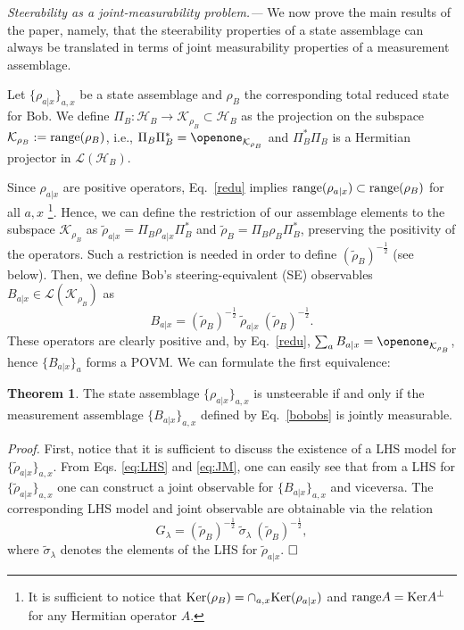 \documentclass[10pt,twocolumn,aps,prl,nobibnotes,showpacs,superscriptaddress,floatfix]{revtex4-1}
\theoremstyle{definition}
\newtheorem{theorem}{Theorem}
\begin{document}
{\it Steerability as a joint-measurability problem.---} 
We now prove the main results of the paper, namely, that the steerability properties of a state assemblage can always be translated in terms of joint measurability properties of a measurement assemblage.

Let $\{\rho_{a|x}\}_{a,x}$ be a state assemblage and $\rho_B$ the corresponding total reduced state for Bob. We define ${\Pi_B: \mathcal{H}_B \rightarrow \mathcal{K}_{\rho_B}\subset \mathcal{H}_B}$ as the projection on the subspace $\mathcal{K}_{\rho_B} := {\rm range}(\rho_B)$, i.e., $\Pi_B \Pi_B^*=\openone_{\mathcal{K}_{\rho_B}}$ and $\Pi_B^* \Pi_B$ is a Hermitian projector in $\mathcal{L}(\mathcal{H}_B)$.  

Since $\rho_{a|x}$ are positive operators, Eq.~\eqref{redu} implies ${\rm range}(\rho_{a|x})\subset {\rm range}(\rho_B)$ for all $a,x$ \footnote{It is sufficient to notice that ${\rm Ker}(\rho_B)=\cap_{a,x}{\rm Ker}(\rho_{a|x})$ and ${\rm range}{A}={\rm Ker} A^\perp$ for any Hermitian operator $A$.}. Hence, we can define the restriction of our assemblage elements to the subspace $\mathcal{K}_{\rho_B}$ as $\tilde{\rho}_{a|x} = \Pi_B \rho_{a|x} \Pi_B^*$ and $\tilde{\rho}_B= \Pi_B \rho_B \Pi_B^*$, preserving the positivity of the operators. Such a restriction is needed in order to define $(\tilde{\rho}_B)^{-\frac{1}{2}}$ (see below).
Then, we define Bob's steering-equivalent (SE) observables $B_{a|x}\in \mathcal{L}(\mathcal{K}_{\rho_B})$ as
\begin{equation}\label{bobobs}
B_{a|x} = (\tilde{\rho}_B)^{-\frac{1}{2}}\ \tilde{\rho}_{a|x}\ (\tilde{\rho}_B)^{-\frac{1}{2}}.
\end{equation}
These operators are clearly positive and, by Eq.~\eqref{redu}, $\sum_a B_{a|x}=\openone_{\mathcal{K}_{\rho_B}}$, hence $\{B_{a|x}\}_a$ forms a POVM. 
We can formulate the first equivalence:

\begin{theorem}\label{th:bobs}
The state assemblage $\{\rho_{a|x}\}_{a,x}$ is unsteerable if and only if the measurement assemblage $\{B_{a|x}\}_{a,x}$ defined by Eq.~\eqref{bobobs} is jointly measurable. 
\end{theorem} 

{\it Proof.} First, notice that it is sufficient to discuss the existence of a LHS model for $\{ \tilde{\rho}_{a|x}\}_{a,x}$. From Eqs. \eqref{eq:LHS} and \eqref{eq:JM}, one can easily see that from a LHS for $\{ \tilde{\rho}_{a|x}\}_{a,x}$ one can construct a joint observable for $\{B_{a|x}\}_{a,x}$ and viceversa. The corresponding LHS model and joint observable are obtainable via the relation
\begin{equation}
G_\lambda = (\tilde{\rho}_B)^{-\frac{1}{2}}\ \tilde{\sigma}_{\lambda}\ (\tilde{\rho}_B)^{-\frac{1}{2}},
\end{equation}
where $\tilde{\sigma}_{\lambda}$ denotes the elements of the LHS for $\tilde{\rho}_{a|x}$.  
$\hfill \Box$
\end{document}
